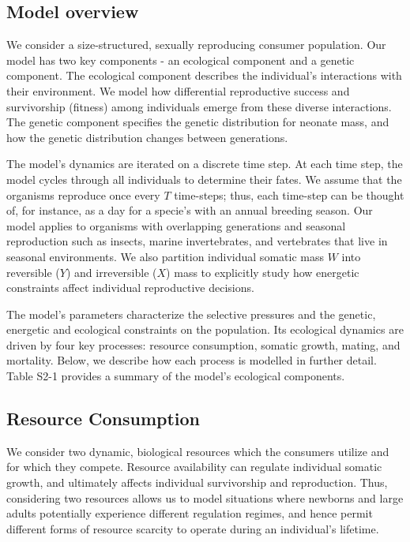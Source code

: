 \documentclass[11pt]{article}
\begin{document}
\begin{linenumbers}
\subsection*{Model overview}
We consider a size-structured, sexually reproducing consumer population. Our model has two key components - an ecological component and a genetic component. The ecological component describes the individual's interactions with their environment. We model how differential reproductive success and survivorship (fitness) among individuals emerge from these diverse interactions. The genetic component specifies the genetic distribution for neonate mass, and how the genetic distribution changes between generations. 

The model's dynamics are iterated on a discrete time step. At each time step, the model cycles through all individuals to determine their fates. We assume that the organisms reproduce once every $T$ time-steps; thus, each time-step can be thought of, for instance, as a day for a specie's with an annual breeding season. Our model applies to organisms with overlapping generations and seasonal reproduction such as insects, marine invertebrates, and vertebrates that live in seasonal environments. We also partition individual somatic mass $W$ into reversible ($Y$) and irreversible ($X$) mass to explicitly study how energetic constraints affect individual reproductive decisions. 

The model's parameters characterize the selective pressures and the genetic, energetic and ecological constraints on the population. Its ecological dynamics are driven by four key processes: resource consumption, somatic growth, mating, and mortality. Below, we describe how each process is modelled in further detail. Table S2-1 provides a summary of the model's ecological components. 

\subsection*{Resource Consumption}
We consider two dynamic, biological resources which the consumers utilize and for which they compete. Resource availability can regulate individual somatic growth, and ultimately affects individual survivorship and reproduction. Thus, considering two resources allows us to model situations where newborns and large adults potentially experience different regulation regimes, and hence permit different forms of resource scarcity to operate during an individual's lifetime. 


\end{linenumbers}
\end{document}
